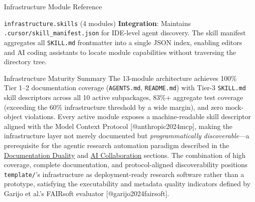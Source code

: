 \documentclass[
  ignorenonframetext,
]{beamer}
\begin{document}
\begin{frame}[fragile]{Infrastructure Module Reference}
\begin{block}{\texttt{infrastructure.skills} (4 modules)}
\textbf{Integration}: Maintains \texttt{.cursor/skill\_manifest.json}
for IDE-level agent discovery. The skill manifest aggregates all
\texttt{SKILL.md} frontmatter into a single JSON index, enabling editors
and AI coding assistants to locate module capabilities without
traversing the directory tree.
\end{block}

\begin{block}{Infrastructure Maturity Summary}
\protect{}\label{infrastructure-maturity-summary}
The 13-module architecture achieves 100\% Tier 1--2 documentation
coverage (\texttt{AGENTS.md}, \texttt{README.md}) with Tier-3
\texttt{SKILL.md} skill descriptors across all 10 active subpackages,
83\%+ aggregate test coverage (exceeding the 60\% infrastructure
threshold by a wide margin), and zero mock-object violations. Every
active module exposes a machine-readable skill descriptor aligned with
the Model Context Protocol {[}@anthropic2024mcp{]}, making the
infrastructure layer not merely documented but \emph{programmatically
discoverable}---a prerequisite for the agentic research automation
paradigm described in the
\href{03c_documentation.md\#documentation-duality-and-ai-collaboration}{Documentation
Duality} and
\href{05d_ai_collaboration.md\#the-ai-collaboration-model}{AI
Collaboration} sections. The combination of high coverage, complete
documentation, and protocol-aligned discoverability positions
\texttt{template/}'s infrastructure as deployment-ready research
software rather than a prototype, satisfying the executability and
metadata quality indicators defined by Garijo et al.'s FAIRsoft
evaluator {[}@garijo2024fairsoft{]}.
\end{block}
\end{frame}
\end{document}
